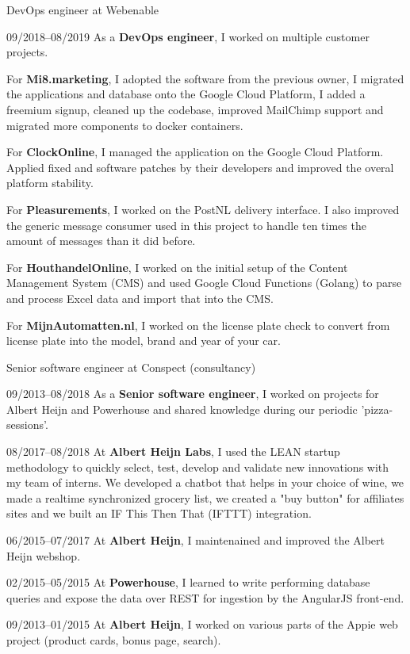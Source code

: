 \documentclass[11pt,a4paper]{article}
\begin{document}
\begin{cv}{}
	\begin{cvlist}{DevOps engineer at Webenable}
		\item[09/2018--08/2019] As a \textbf{DevOps engineer}, I worked on multiple
		customer projects.

		For \textbf{Mi8.marketing}, I adopted the software from the previous owner,
		I migrated the applications and database onto the Google Cloud Platform, I
		added a freemium signup, cleaned up the codebase, improved MailChimp
		support and migrated more components to docker containers.

		For \textbf{ClockOnline}, I managed the application on the Google Cloud
		Platform. Applied fixed and software patches by their developers and
		improved the overal platform stability.

		For \textbf{Pleasurements}, I worked on the PostNL delivery interface. I
		also improved the generic message consumer used in this project to handle
		ten times the amount of messages than it did before.

		For \textbf{HouthandelOnline}, I worked on the initial setup of the Content
		Management System (CMS) and used Google Cloud Functions (Golang) to parse
		and process Excel data and import that into the CMS.

		For \textbf{MijnAutomatten.nl}, I worked on the license plate check to
		convert from license plate into the model, brand and year of your car.
	\end{cvlist}

	\begin{cvlist}{Senior software engineer at Conspect (consultancy)}
		\item[09/2013--08/2018] As a \textbf{Senior software engineer}, I worked on
		projects for Albert Heijn and Powerhouse and shared knowledge during our
		periodic 'pizza-sessions'.
		\item[\color{gray}08/2017--08/2018] At \textbf{Albert Heijn Labs}, I used
		the LEAN startup methodology to quickly select, test, develop and validate
		new innovations with my team of interns. We developed a chatbot that helps
		in your choice of wine, we made a realtime synchronized grocery list, we
		created a "buy button" for affiliates sites and we built an IF This Then
		That (IFTTT) integration.
		\item[\color{gray}06/2015--07/2017] At \textbf{Albert Heijn}, I
		maintenained and improved the Albert Heijn webshop.
		\item[\color{gray}02/2015--05/2015] At \textbf{Powerhouse}, I learned to
		write performing database queries and expose the data over REST for
		ingestion by the AngularJS front-end.
		\item[\color{gray}09/2013--01/2015] At \textbf{Albert Heijn}, I worked on
		various parts of the Appie web project (product cards, bonus page, search).
	\end{cvlist}


\end{cv}
\end{document}
